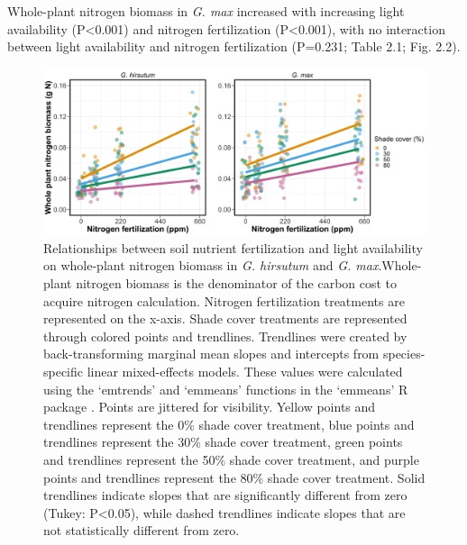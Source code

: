Whole-plant nitrogen biomass in \textit{G. max} increased with increasing light availability (P<0.001) and nitrogen fertilization (P<0.001), with no interaction between light availability and nitrogen fertilization (P=0.231; Table 2.1; Fig. 2.2).

\newpage
\begin{figure}
    \includegraphics[width=\textwidth]{ch2_LxN_Greenhouse/figs/fig2_nacq.png}
    \centering
    \caption[Relationships between soil nitrogen fertilization and light availability on whole-plant nitrogen biomass in \textit{G. hirsutum} and \textit{G. max}]{Relationships between soil nutrient fertilization and light availability on whole-plant nitrogen biomass in \textit{G. hirsutum} and \textit{G. max}.Whole-plant nitrogen biomass is the denominator of the carbon cost to acquire nitrogen calculation. Nitrogen fertilization treatments are represented on the x-axis. Shade cover treatments are represented through colored points and trendlines. Trendlines were created by back-transforming marginal mean slopes and intercepts from species-specific linear mixed-effects models. These values were calculated using the ‘emtrends’ and ‘emmeans’ functions in the ‘emmeans’ R package . Points are jittered for visibility. Yellow points and trendlines represent the 0\% shade cover treatment, blue points and trendlines represent the 30\% shade cover treatment, green points and trendlines represent the 50\% shade cover treatment, and purple points and trendlines represent the 80\% shade cover treatment. Solid trendlines indicate slopes that are significantly different from zero (Tukey: P<0.05), while dashed trendlines indicate slopes that are not statistically different from zero.}
    \label{fig:figure2.2}
    \small
\end{figure}
\clearpage

\newpage

